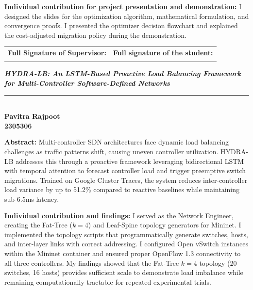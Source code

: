 \documentclass[12pt,a4paper]{report}
\newcommand{\ProjectTitle}{HYDRA-LB: An LSTM-Based Proactive Load Balancing Framework for Multi-Controller Software-Defined Networks}
\begin{document}
\vspace{0.5cm}
\noindent\textbf{Individual contribution for project presentation and demonstration:} I designed the slides for the optimization algorithm, mathematical formulation, and convergence proofs. I presented the optimizer decision flowchart and explained the cost-adjusted migration policy during the demonstration.

\vspace{1.5cm}
\noindent\begin{tabular}{p{7cm}p{7cm}}
\textbf{Full Signature of Supervisor:} & \textbf{Full signature of the student:} \\
\dotfill & \dotfill \\
\end{tabular}

\newpage
\thispagestyle{fancy}
\begin{center}
{\large \textbf{\textit{\ProjectTitle}}}\\
\rule{\textwidth}{0.4pt}\\[1cm]

{\Large \textbf{Pavitra Rajpoot}}\\
{\large \textbf{2305306}}\\[0.8cm]
\end{center}

\noindent\textbf{Abstract:} Multi-controller SDN architectures face dynamic load balancing challenges as traffic patterns shift, causing uneven controller utilization. HYDRA-LB addresses this through a proactive framework leveraging bidirectional LSTM with temporal attention to forecast controller load and trigger preemptive switch migrations. Trained on Google Cluster Traces, the system reduces inter-controller load variance by up to 51.2\% compared to reactive baselines while maintaining sub-6.5ms latency.

\vspace{0.5cm}
\noindent\textbf{Individual contribution and findings:} I served as the Network Engineer, creating the Fat-Tree ($k=4$) and Leaf-Spine topology generators for Mininet. I implemented the topology scripts that programmatically generate switches, hosts, and inter-layer links with correct addressing. I configured Open vSwitch instances within the Mininet container and ensured proper OpenFlow 1.3 connectivity to all three controllers. My findings showed that the Fat-Tree $k=4$ topology (20 switches, 16 hosts) provides sufficient scale to demonstrate load imbalance while remaining computationally tractable for repeated experimental trials.
\end{document}
